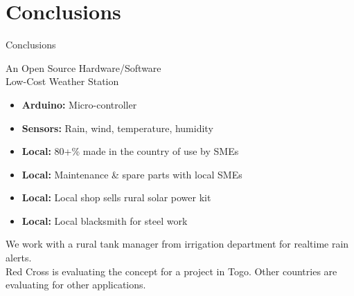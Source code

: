 \documentclass[xcolor=dvipsnames,beamer]{beamer} %
\begin{document}
\section{Conclusions}
\begin{frame}[fragile]{Conclusions}

\begin{block}{An Open Source Hardware/Software\\ Low-Cost Weather Station}
\begin{itemize} 
 \item {\bf Arduino:} Micro-controller 
 \item {\bf Sensors:} Rain, wind, temperature, humidity
 \item {\bf Local:} 80+\% made in the country of use by SMEs
 \item {\bf Local:} Maintenance \& spare parts with local SMEs
 \item {\bf Local:} Local shop sells rural solar power kit
 \item {\bf Local:} Local blacksmith for steel work
\end{itemize}
We work with a rural tank manager from irrigation department for realtime rain alerts.\\Red Cross is evaluating the concept for a project in Togo. Other countries are evaluating for other applications.
\end{block}

\end{frame}
\end{document}
